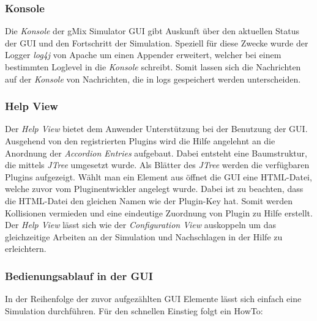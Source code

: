 \documentclass[a4paper, 11pt]{article} %
\begin{document}
\subsubsection{Konsole} %
\label{ssub:consoleview}
Die \emph{Konsole} der gMix Simulator GUI gibt Auskunft über den aktuellen Status der GUI und den Fortschritt der Simulation. Speziell für diese Zwecke wurde der Logger \emph{log4j} von Apache um einen Appender erweitert, welcher bei einem bestimmten Loglevel in die \emph{Konsole} schreibt. Somit lassen sich die Nachrichten auf der \emph{Konsole} von Nachrichten, die in logs gespeichert werden unterscheiden.

\subsubsection{Help View} %
\label{ssub:helpview}
Der \emph{Help View} bietet dem Anwender Unterstützung bei der Benutzung der GUI. Ausgehend von den registrierten Plugins wird die Hilfe angelehnt an die Anordnung der \emph{Accordion Entries} aufgebaut. Dabei entsteht eine Baumstruktur, die mittels \emph{JTree} umgesetzt wurde. Als Blätter des \emph{JTree} werden die verfügbaren Plugins aufgezeigt. Wählt man ein Element aus öffnet die GUI eine HTML-Datei, welche zuvor vom Pluginentwickler angelegt wurde. Dabei ist zu beachten, dass die HTML-Datei den gleichen Namen wie der Plugin-Key hat. Somit werden Kollisionen vermieden und eine eindeutige Zuordnung von Plugin zu Hilfe erstellt. Der \emph{Help View} lässt sich wie der \emph{Configuration View} auskoppeln um das gleichzeitige Arbeiten an der Simulation und Nachschlagen in der Hilfe zu erleichtern.

\subsubsection{Bedienungsablauf in der GUI}
\label{ssub:bedienung}
In der Reihenfolge der zuvor aufgezählten GUI Elemente lässt sich einfach eine Simulation durchführen. Für den schnellen Einstieg folgt ein HowTo:
\end{document}
